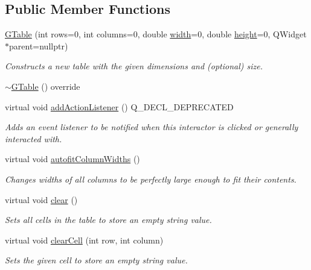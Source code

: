 \subsection*{Public Member Functions}
\begin{DoxyCompactItemize}
\item 
\mbox{\hyperlink{classGTable_a5ceea9546881f429ad4601366908848d}{G\+Table}} (int rows=0, int columns=0, double \mbox{\hyperlink{classGTable_ad72663daf610f2a0833a2fc3d78e4fdf}{width}}=0, double \mbox{\hyperlink{classGTable_ad3774f6419003470f54fd495124ef51f}{height}}=0, Q\+Widget $\ast$parent=nullptr)
\begin{DoxyCompactList}\small\item\em Constructs a new table with the given dimensions and (optional) size. \end{DoxyCompactList}\item 
\mbox{\hyperlink{classGTable_aa9d949edf98f5e891678aca78500550b}{$\sim$\+G\+Table}} () override
\item 
virtual void \mbox{\hyperlink{classGInteractor_a02f20ea6edfa0671f31c4c648a253833}{add\+Action\+Listener}} () Q\+\_\+\+D\+E\+C\+L\+\_\+\+D\+E\+P\+R\+E\+C\+A\+T\+ED
\begin{DoxyCompactList}\small\item\em Adds an event listener to be notified when this interactor is clicked or generally interacted with. \end{DoxyCompactList}\item 
virtual void \mbox{\hyperlink{classGTable_afaf36ccb6a75432b5f5463613ef01ef4}{autofit\+Column\+Widths}} ()
\begin{DoxyCompactList}\small\item\em Changes widths of all columns to be perfectly large enough to fit their contents. \end{DoxyCompactList}\item 
virtual void \mbox{\hyperlink{classGTable_ac8bb3912a3ce86b15842e79d0b421204}{clear}} ()
\begin{DoxyCompactList}\small\item\em Sets all cells in the table to store an empty string value. \end{DoxyCompactList}\item 
virtual void \mbox{\hyperlink{classGTable_ab7bffbf52806e438ac155886079d9bf6}{clear\+Cell}} (int row, int column)
\begin{DoxyCompactList}\small\item\em Sets the given cell to store an empty string value. \end{DoxyCompactList}\item 

\end{DoxyCompactItemize}
